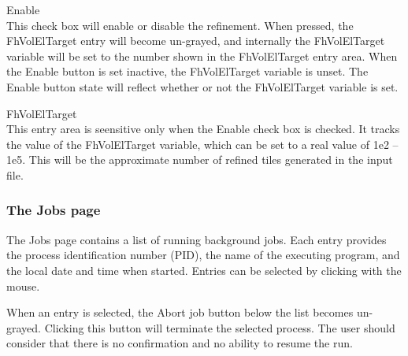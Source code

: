 \begin{description}
\item{\cb Enable}\\
This check box will enable or disable the refinement.  When pressed,
the {\cb FhVolElTarget} entry will become un-grayed, and internally
the {\et FhVolElTarget} variable will be set to the number shown
in the {\cb FhVolElTarget} entry area.  When the {\cb Enable} button
is set inactive, the {\et FhVolElTarget} variable is unset.  The {\cb
Enable} button state will reflect whether or not the {\et
FhVolElTarget} variable is set.

\item{\cb FhVolElTarget}\\
This entry area is seensitive only when the {\cb Enable} check box is
checked.  It tracks the value of the {\et FhVolElTarget} variable,
which can be set to a real value of 1e2 -- 1e5.  This will be the
approximate number of refined tiles generated in the input file.
\end{description}

\subsubsection{The Jobs page}

The {\cb Jobs} page contains a list of running background jobs.  Each
entry provides the process identification number (PID), the name of
the executing program, and the local date and time when started. 
Entries can be selected by clicking with the mouse.

When an entry is selected, the {\cb Abort job} button below the list
becomes un-grayed.  Clicking this button will terminate the selected
process.  The user should consider that there is no confirmation and
no ability to resume the run.

